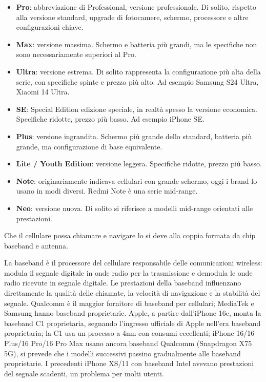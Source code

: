 \begin{itemize}
  \item \textbf{Pro}: abbreviazione di Professional, versione professionale. Di solito, rispetto alla versione standard, upgrade di fotocamere, schermo, processore e altre configurazioni chiave.
  \item \textbf{Max}: versione massima. Schermo e batteria più grandi, ma le specifiche non sono necessariamente superiori al Pro.
  \item \textbf{Ultra}: versione estrema. Di solito rappresenta la configurazione più alta della serie, con specifiche spinte e prezzo più alto. Ad esempio Samsung S24 Ultra, Xiaomi 14 Ultra.
  \item \textbf{SE}: Special Edition edizione speciale, in realtà spesso la versione economica. Specifiche ridotte, prezzo più basso. Ad esempio iPhone SE.
  \item \textbf{Plus}: versione ingrandita. Schermo più grande dello standard, batteria più grande, ma configurazione di base equivalente.
  \item \textbf{Lite / Youth Edition}: versione leggera. Specifiche ridotte, prezzo più basso.
  \item \textbf{Note}: originariamente indicava cellulari con grande schermo, oggi i brand lo usano in modi diversi. Redmi Note è una serie mid-range.
  \item \textbf{Neo}: versione nuova. Di solito si riferisce a modelli mid-range orientati alle prestazioni.
\end{itemize}


Che il cellulare possa chiamare e navigare lo si deve alla coppia formata da chip baseband e antenna.


La baseband è il processore del cellulare responsabile delle comunicazioni wireless: modula il segnale digitale in onde radio per la trasmissione e demodula le onde radio ricevute in segnale digitale. Le prestazioni della baseband influenzano direttamente la qualità delle chiamate, la velocità di navigazione e la stabilità del segnale. Qualcomm è il maggior fornitore di baseband per cellulari; MediaTek e Samsung hanno baseband proprietarie. Apple, a partire dall'iPhone 16e, monta la baseband C1 proprietaria, segnando l'ingresso ufficiale di Apple nell'era baseband proprietaria; la C1 usa un processo a 4nm con consumi eccellenti; iPhone 16/16 Plus/16 Pro/16 Pro Max usano ancora baseband Qualcomm (Snapdragon X75 5G), si prevede che i modelli successivi passino gradualmente alle baseband proprietarie. I precedenti iPhone XS/11 con baseband Intel avevano prestazioni del segnale scadenti, un problema per molti utenti.

